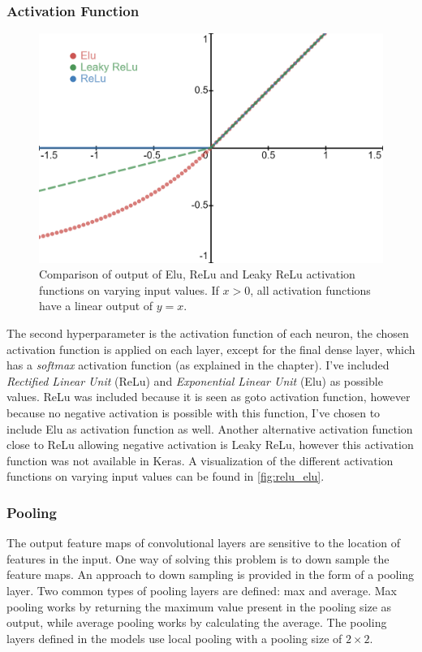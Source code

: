\subsubsection{Activation Function}
\begin{figure}[t]
    \centering
    \includegraphics[width=.8\textwidth]{images/relu_elu-wide}
    \caption{Comparison of output of Elu, ReLu and Leaky ReLu activation functions on varying input values. If $x>0$, all activation functions have a linear output of $y=x$.}
    \label{fig:relu_elu}
\end{figure}
The second hyperparameter is the activation function of each neuron, the chosen activation function is applied on each layer, except for the final dense layer, which has a \textit{softmax} activation function (as explained in the  chapter). I've included \textit{Rectified Linear Unit} (ReLu) \cite{Agarap2018deep} and \textit{Exponential Linear Unit} (Elu) as possible values. ReLu was included because it is seen as goto activation function, however because no negative activation is possible with this function, I've chosen to include Elu as activation function as well. Another alternative activation function close to ReLu allowing negative activation is Leaky ReLu, however this activation function was not available in Keras. A visualization of the different activation functions on varying input values can be found in \autoref{fig:relu_elu}.

\subsubsection{Pooling}
The output feature maps of convolutional layers are sensitive to the location of features in the input. One way of solving this problem is to down sample the feature maps. An approach to down sampling is provided in the form of a pooling layer. Two common types of pooling layers are defined: max and average. Max pooling works by returning the maximum value present in the pooling size as output, while average pooling works by calculating the average. The pooling layers defined in the models use local pooling with a pooling size of $2\times2$. 

